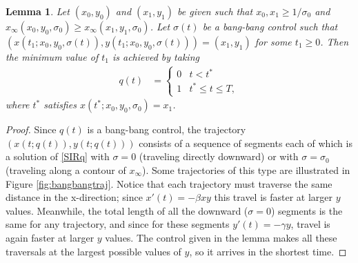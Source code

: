 \documentclass[english,12pt,letter]{article}
\newtheorem{lem}{Lemma}
\newcommand{\Rnot}{\sigma_0}
\newcommand{\Sinf}{x_\infty}
\begin{document}
\begin{lem} \label{lem:shortest-path}
Let $(x_0,y_0)$ and $(x_1,y_1)$ be given such that $x_0, x_1 \ge 1/\Rnot$ and
$\Sinf(x_0,y_0,\Rnot)\ge\Sinf(x_1,y_1,\Rnot)$.
Let $\sigma(t)$ be a bang-bang control such that $(x(t_1;x_0,y_0,\sigma(t)),y(t_1;x_0,y_0,\sigma(t)))=(x_1,y_1)$
for some $t_1\ge0$.  Then the minimum value of $t_1$ is achieved by taking
\begin{align}
    q(t) & = \begin{cases}  
        0 & t<t^* \\
        1 & t^* \le  t \le T,
    \end{cases}
\end{align}
where $t^*$ satisfies $x(t^*;x_0,y_0,\Rnot)=x_1$.
\end{lem}
\begin{proof}
Since $q(t)$ is a bang-bang control, the trajectory $(x(t;q(t)),y(t;q(t)))$ 
consists of a sequence of segments each of which is a solution of
\eqref{SIRq} with $\sigma=0$ (traveling directly downward) or with $\sigma=\sigma_0$
(traveling along a contour of $x_\infty$).  Some trajectories of this type are
illustrated in Figure \ref{fig:bangbangtraj}.  Notice that each trajectory must
traverse the same distance in the x-direction; since $x'(t)=-\beta xy$ this
travel is faster at larger $y$ values.  Meanwhile, the total length of all the
downward ($\sigma=0$) segments is the same for any trajectory, and since for
these segments $y'(t) = -\gamma y$, travel is again faster at larger $y$ values.
The control given in the lemma makes all these traversals at the largest
possible values of $y$, so it arrives in the shortest time.
\end{proof}
\end{document}
